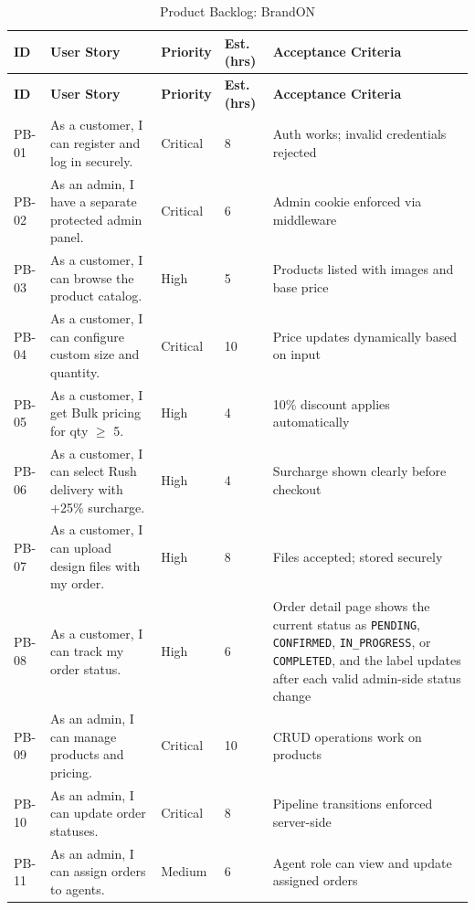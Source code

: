 \documentclass[12pt,a4paper]{report}
\begin{document}
\begingroup
\small
\setlength{\LTleft}{0pt}
\setlength{\LTright}{0pt}
\setlength{\tabcolsep}{3pt}
\renewcommand{\arraystretch}{1.12}
\begin{xltabular}{\textwidth}{@{}L{0.9cm} L{4cm} L{1.6cm} R{1.1cm} X@{}}
  \caption{Product Backlog: BrandON} \\
  \toprule
  \textbf{ID} & \textbf{User Story} & \textbf{Priority} & \textbf{Est. (hrs)} & \textbf{Acceptance Criteria} \\
  \midrule
  \endfirsthead
  \toprule
  \textbf{ID} & \textbf{User Story} & \textbf{Priority} & \textbf{Est. (hrs)} & \textbf{Acceptance Criteria} \\
  \midrule
  \endhead
  \bottomrule
  \endfoot
  PB-01 & As a customer, I can register and log in securely.           & Critical & 8  & Auth works; invalid credentials rejected \\
  PB-02 & As an admin, I have a separate protected admin panel.        & Critical & 6  & Admin cookie enforced via middleware \\
  PB-03 & As a customer, I can browse the product catalog.            & High     & 5  & Products listed with images and base price \\
  PB-04 & As a customer, I can configure custom size and quantity.     & Critical & 10 & Price updates dynamically based on input \\
  PB-05 & As a customer, I get Bulk pricing for qty $\geq$ 5.        & High     & 4  & 10\% discount applies automatically \\
  PB-06 & As a customer, I can select Rush delivery with +25\% surcharge. & High & 4  & Surcharge shown clearly before checkout \\
  PB-07 & As a customer, I can upload design files with my order.      & High     & 8  & Files accepted; stored securely \\
  PB-08 & As a customer, I can track my order status.                  & High     & 6  & Order detail page shows the current status as \texttt{PENDING}, \texttt{CONFIRMED}, \texttt{IN\_PROGRESS}, or \texttt{COMPLETED}, and the label updates after each valid admin-side status change \\
  PB-09 & As an admin, I can manage products and pricing.             & Critical & 10 & CRUD operations work on products \\
  PB-10 & As an admin, I can update order statuses.                   & Critical & 8  & Pipeline transitions enforced server-side \\
  PB-11 & As an admin, I can assign orders to agents.                 & Medium   & 6  & Agent role can view and update assigned orders \\

\end{xltabular}
\end{document}
